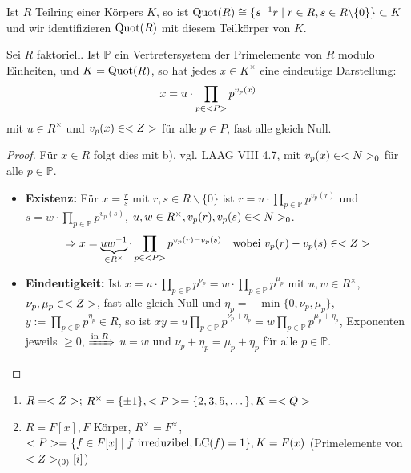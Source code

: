 \begin{remark}
	Ist $R$ Teilring einer Körpers $K$, so ist $\Quot(R) \cong \{s^{-1}r \mid r\in R, s \in R\backslash \{0\}\} \subset K$ und wir identifizieren $\Quot(R)$ mit diesem Teilkörper von $K$.
\end{remark}

\begin{proposition}
	Sei $R$ faktoriell. Ist $\mathbb{P}$ ein Vertretersystem der Primelemente von $R$ modulo Einheiten, und $K = \Quot(R)$, so hat jedes $x \in K^{\times}$ eine eindeutige Darstellung:
	\begin{align}
		x = u \cdot \prod_{p\in \mathbb{P}} p^{v_p(x)} \notag
	\end{align}
	mit $u \in R^{\times}$ und $v_p(x) \in \whole$ für alle $p \in P$, fast alle gleich Null.
\end{proposition}

\begin{proof}
	Für $x \in R$ folgt dies mit b), vgl. LAAG VIII 4.7, mit $v_p(x) \in \natur_0$ für alle $p \in \mathbb{P}$.
	\begin{itemize}
		\item \textbf{Existenz:} Für $x=\frac{r}{s}$ mit $r,s \in R\backslash\{0\}$ ist $r = u \cdot \prod_{p\in\mathbb{P}} p^{v_p(r)}$ und $s = w\cdot \prod_{p\in\mathbb{P}} p^{v_p(s)}$, $u, w \in R^{\times}, v_p(r), v_p(s) \in \natur_0$.
		\begin{align}
		\Rightarrow x = \underbrace{uw^{-1}}_{\in R^{\times}}\cdot \prod_{p\in\mathbb{P}} p^{v_p(r)-v_p(s)}\quad\text{wobei } v_p(r) - v_p(s) \in \whole \notag
		\end{align}
		\item \textbf{Eindeutigkeit:} Ist $x=u \cdot \prod_{p\in\mathbb{P}} p^{\nu_p} = w \cdot \prod_{p\in\mathbb{P}} p^{\mu_p}$ mit $u,w \in R^{\times}$, $\nu_p,\mu_p \in \whole$, fast alle gleich Null und $\eta_p = - \min\{0, \nu_p,\mu_p\}$, $y:= \prod_{p\in\mathbb{P}} p^{\eta_p} \in R$, so ist $xy = u \prod_{p\in\mathbb{P}} p^{\nu_p + \eta_p} = w \prod_{p\in\mathbb{P}} p ^{\mu_p + \eta_p}$, Exponenten jeweils $\ge 0$, $\xRightarrow{\text{in }R}$ $u = w$ und $\nu_p + \eta_p = \mu_p + \eta_p$ für alle $p \in \mathbb{P}$.  
		\end{itemize}
\end{proof}

\begin{example}
	\begin{enumerate}[label=(\alph*)]
		\item $R = \whole$; $R^{\times} = \{\pm 1\}, \mathbb{P} = \{2,3,5,\dots\}, K = \ratio$
		\item $R = F[x], F$ Körper, $R^{\times} = F^{\times}$, $\mathbb{P} = \{f \in F[x]\mid f \text{ irreduzibel}, \LC(f) = 1\}, K = F(x)$ (Primelemente von $\whole_{(0)}[i]$)
	\end{enumerate}
\end{example}

